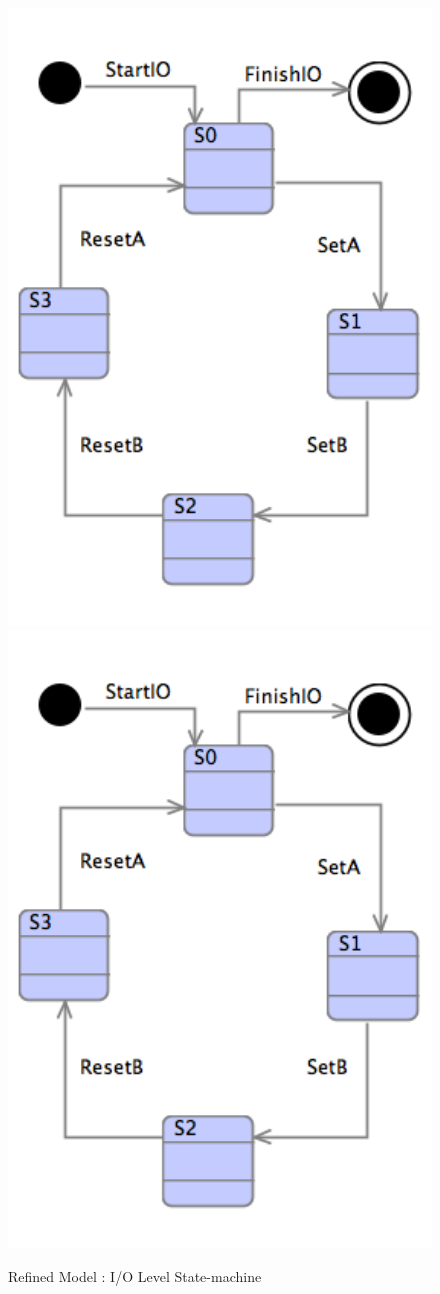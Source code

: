  \begin{figure}[!htbp]
  \centering
  \ifplastex
  \includegraphics[width=1024]{figures/image55.png}
  \else
  \includegraphics[width=1\textwidth]{figures/image55.png}
  \fi
  \caption{Refined Model : I/O Level State-machine}
  \label{RefinedModelIOLevelStatemachine}
\end{figure} 

